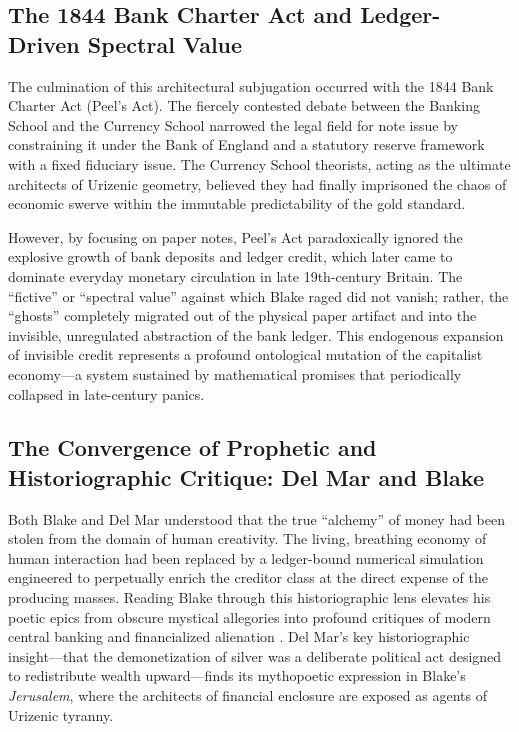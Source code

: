 \documentclass[
]{article}
\begin{document}
\subsection{The 1844 Bank Charter Act and Ledger-Driven Spectral
Value}\label{the-1844-bank-charter-act-and-ledger-driven-spectral-value}

The culmination of this architectural subjugation occurred with the 1844
Bank Charter Act (Peel's Act). The fiercely contested debate between the
Banking School and the Currency School narrowed the legal field for note
issue by constraining it under the Bank of England and a statutory
reserve framework with a fixed fiduciary issue. The Currency School
theorists, acting as the ultimate architects of Urizenic geometry,
believed they had finally imprisoned the chaos of economic swerve within
the immutable predictability of the gold standard.

However, by focusing on paper notes, Peel's Act paradoxically ignored
the explosive growth of bank deposits and ledger credit, which later
came to dominate everyday monetary circulation in late 19th-century
Britain. The ``fictive'' or ``spectral value'' against which Blake raged
did not vanish; rather, the ``ghosts'' completely migrated out of the
physical paper artifact and into the invisible, unregulated abstraction
of the bank ledger. This endogenous expansion of invisible credit
represents a profound ontological mutation of the capitalist economy---a
system sustained by mathematical promises that periodically collapsed in
late-century panics.

\subsection{The Convergence of Prophetic and Historiographic Critique:
Del Mar and
Blake}\label{the-convergence-of-prophetic-and-historiographic-critique-del-mar-and-blake}

Both Blake and Del Mar understood that the true ``alchemy'' of money had
been stolen from the domain of human creativity. The living, breathing
economy of human interaction had been replaced by a ledger-bound
numerical simulation engineered to perpetually enrich the creditor class
at the direct expense of the producing masses. Reading Blake through
this historiographic lens elevates his poetic epics from obscure
mystical allegories into profound critiques of modern central banking
and financialized alienation
\citep{poovey2008genres, baucom2005specters}. Del Mar's key
historiographic insight---that the demonetization of silver was a
deliberate political act designed to redistribute wealth upward---finds
its mythopoetic expression in Blake's \emph{Jerusalem}, where the
architects of financial enclosure are exposed as agents of Urizenic
tyranny.
\end{document}
